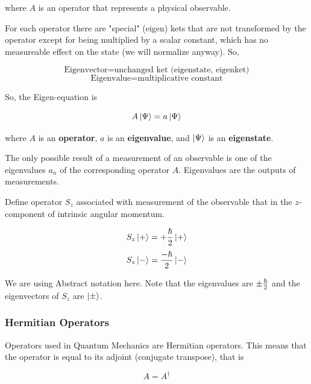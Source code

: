 \documentclass[english, 11pt]{article}
\begin{document}
        where $A$ is an operator that represents a physical observable.
        \newline

        For each operator there are "special" (eigen) kets that are not transformed by the operator except for being multiplied by a scalar constant, which has no measureable effect on the state (we will normalize anyway). So,

        \[ \mbox{Eigenvector} = \mbox{unchanged ket (eigenstate, eigenket)} \]
        \[ \mbox{Eigenvalue} = \mbox{multiplicative constant} \]

        So, the Eigen-equation is

        \[ A\left|\Psi\right\rangle = a\left|\Psi\right\rangle \]

        where $A$ is an \textbf{operator}, $a$ is an \textbf{eigenvalue}, and $\left|\Psi\right\rangle$ is an \textbf{eigenstate}.

        \begin{defn}[Postulate 3]\label{postulate_3}
          The only possible result of a measurement of an observable is one of the eigenvalues $a_n$ of the corresponding operator $A$. Eigenvalues are the outputs of measurements.
        \end{defn}

        \begin{exmp}
          Define operator $S_z$ associated with measurement of the observable that in the $z$-component of intrinsic angular momentum.

          \[ S_z \left|+\right\rangle = +\frac{\hbar}{2}\left|+\right\rangle \]
          \[ S_z \left|-\right\rangle = \frac{-\hbar}{2}\left|-\right\rangle \]

          We are using Abstract notation here. Note that the eigenvalues are $\pm \frac{\hbar}{2}$ and the eigenvectors of $S_z$ are $\left|\pm\right\rangle$.
        \end{exmp}

      \subsubsection{Hermitian Operators}

        Operators used in Quantum Mechanics are Hermitian operators. This means that the operator is equal to its adjoint (conjugate transpose), that is

        \[ A = A^\dagger \]
\end{document}

